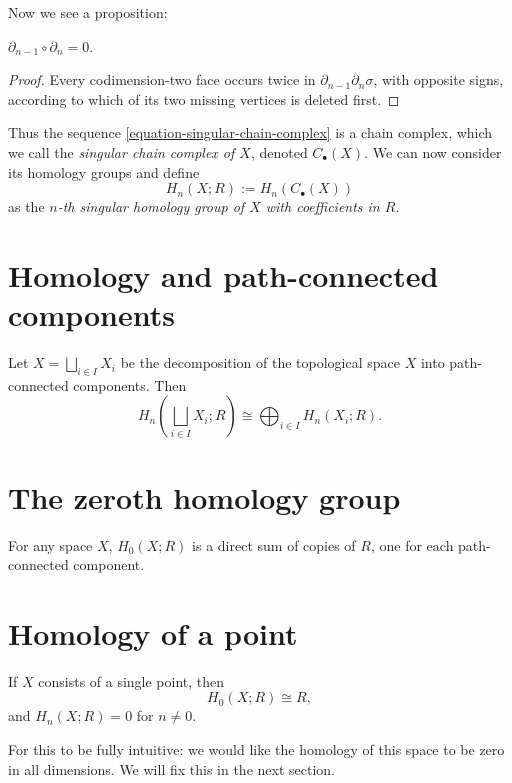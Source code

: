 Now we see a proposition:

\begin{proposition}
$\partial_{n-1}\circ\partial_n=0$.
\end{proposition}

\begin{proof}
Every codimension-two face occurs twice in
$\partial_{n-1}\partial_n\sigma$, with
opposite signs, according to which of its two
missing vertices is deleted first.
\end{proof}

Thus the sequence
\eqref{equation-singular-chain-complex} is a
chain complex, which we
call the \emph{singular chain complex of
$X$}, denoted
$C_\bullet(X)$. We can now consider its
homology groups and
define
$$
H_n(X;R):=H_n(C_\bullet(X))
$$
as the \emph{$n$-th singular homology group
of $X$ with
coefficients in $R$}.
\section{Homology and path-connected
components}
\label{section-homology-components}

\begin{proposition}
Let
$X=\bigsqcup_{i\in I}X_i$
be the decomposition of the topological
space $X$ into path-connected components.
Then
$$
H_n\left(\bigsqcup_{i\in I}X_i;R\right)
\cong
\bigoplus_{i\in I}H_n(X_i;R).
$$
\end{proposition}
\section{The zeroth homology group}
\label{section-zeroth-homology}

\begin{proposition}
For any space $X$, $H_0(X;R)$ is a direct sum
of copies of
$R$, one for each path-connected component.
\end{proposition}
\section{Homology of a point}
\label{section-homology-point}

\begin{proposition}
If $X$ consists of a single point, then
$$
H_0(X;R)\cong R,
$$
and $H_n(X;R)=0$ for $n\neq0$.
\end{proposition}

For this to be fully intuitive: we would like
the homology of
this space to be zero in all dimensions. We
will fix this in
the next section.
